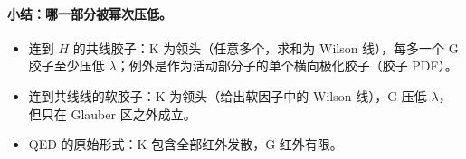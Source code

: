 \paragraph{小结：哪一部分被幂次压低。}
\begin{itemize}
\item 连到 $H$ 的共线胶子：K 为领头（任意多个，求和为 Wilson 线），每多一个 G 胶子至少压低 $\lambda$；例外是作为活动部分子的单个横向极化胶子（胶子 PDF）。
\item 连到共线线的软胶子：K 为领头（给出软因子中的 Wilson 线），G 压低 $\lambda$，但只在 Glauber 区之外成立。
\item QED 的原始形式：K 包含全部红外发散，G 红外有限。
\end{itemize}
